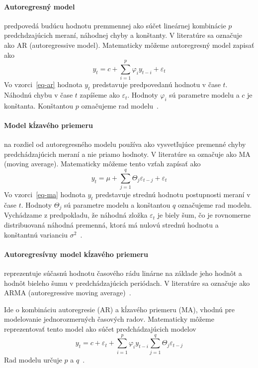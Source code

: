 \documentclass[a4paper,slovak,12pt,appendix]{article}
\begin{document}
\paragraph{Autoregresný model} predpovedá budúcu hodnotu premmennej ako súčet
lineárnej kombinácie $p$ predchdzajúcich meraní, náhodnej chyby a konštanty.
V literatúre sa označuje ako AR (autoregressive model). Matematicky môžeme
autoregresný model zapisať ako
\begin{equation}
  y_t = c + \sum_{i=1}^{p} \varphi_i y_{t-i} + \varepsilon_t
  \label{eq-ar}
\end{equation}
Vo vzorci~\ref{eq-ar} hodnota $y_t$ predstavuje predpovedanú hodnotu
v čase $t$. Náhodnú chybu v čase $t$ zapíšeme ako $\varepsilon_t$. Hodnoty
$\varphi_i$ sú parametre modelu a $c$ je konštanta. Konštantou $p$ označujeme
rad modelu~\cite{Agrawal2013}.

\paragraph{Model kĺzavého priemeru} na rozdiel od autoregresného modelu používa
ako vysvetľujúce premenné chyby predchádzajúcich meraní a nie priamo hodnoty.
V literatúre sa označuje ako MA (moving average). Matematicky môžeme tento
vzťah zapísať ako
\begin{equation}
  y_t = \mu + \sum_{j=1}^{q} \Theta_j \varepsilon_{t-j} + \varepsilon_t
  \label{eq-ma}
\end{equation}
Vo vzorci~\ref{eq-ma} hodnota $y_t$ predstavuje strednú hodnotu
postupnosti meraní v čase $t$. Hodnoty $\Theta_j$ sú parametre modelu
a konštantou $q$ označujeme rad modelu. Vychádzame z predpokladu, že náhodná
zložka $\varepsilon_t$ je biely šum, čo je rovnomerne distribuovaná náhodná
premenná, ktorá má nulovú strednú hodnotu a konštantnú varianciu
$\sigma^2$~\cite{Agrawal2013}.

\paragraph{Autoregresívny model kĺzavého priemeru} reprezentuje súčasnú hodnotu
časového rádu linárne na základe jeho hodnôt a hodnôt bieleho šumu
v predchádzajúcich periódach. V literatúre sa označuje ako ARMA (autoregressive
moving average)~\cite{KumarSingh2013}.

Ide o kombináciu autoregresie (AR) a kĺzavého priemeru (MA), vhodnú pre
modelovanie jednorozmerných časových radov. Matematicky môžeme reprezentovať
tento model ako súčet predchádzajúcich modelov
\begin{equation}
  y_t = c + \varepsilon_t + \sum_{i=1}^{p} \varphi_i y_{t-i}  \sum_{j=1}^{q} \Theta_j \varepsilon_{t-j}
  \label{eq-arma}
\end{equation}
Rad modelu určuje $p$ a $q$~\cite{Agrawal2013}.
\end{document}
